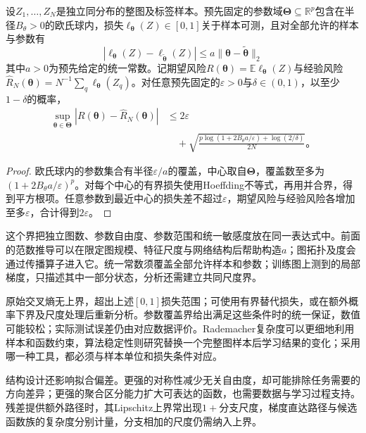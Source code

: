 \begin{theorem}[有界参数图预测的覆盖界]
\label{thm:gnn-cover-generalization}
设$Z_1,\ldots,Z_N$是独立同分布的整图及标签样本。预先固定的参数域$\bm{\Theta}\subseteq\mathbb{R}^{p}$包含在半径$B_\theta>0$的欧氏球内，损失$\ell_{\bm{\theta}}(Z)\in[0,1]$关于样本可测，且对全部允许的样本与参数有
\[
  |\ell_{\bm{\theta}}(Z)-\ell_{\widetilde{\bm{\theta}}}(Z)|
    \leq a\lVert\bm{\theta}-\widetilde{\bm{\theta}}\rVert_2
\]
其中$a>0$为预先给定的统一常数。记期望风险$R(\bm{\theta})=\mathbb{E}\ell_{\bm{\theta}}(Z)$与经验风险$\widehat R_N(\bm{\theta})=N^{-1}\sum_q\ell_{\bm{\theta}}(Z_q)$。对任意预先固定的$\varepsilon>0$与$\delta\in(0,1)$，以至少$1-\delta$的概率，
\begin{equation}
  \begin{aligned}
    \sup_{\bm{\theta}\in\bm{\Theta}}
      |R(\bm{\theta})-\widehat R_N(\bm{\theta})|
      &\leq2\varepsilon\\
      &\quad+\sqrt{\frac{p\log(1+2B_\theta a/\varepsilon)
        +\log(2/\delta)}{2N}}\text{。}
  \end{aligned}
  \label{eq:gnn-cover-risk}
\end{equation}
\end{theorem}
\begin{proof}
欧氏球内的参数集合有半径$\varepsilon/a$的覆盖，中心取自$\bm{\Theta}$，覆盖数至多为$(1+2B_\theta a/\varepsilon)^p$。对每个中心的有界损失使用Hoeffding不等式，再用并合界，得到平方根项。任意参数到最近中心的损失差不超过$\varepsilon$，期望风险与经验风险各增加至多$\varepsilon$，合计得到$2\varepsilon$。
\end{proof}

这个界把独立图数、参数自由度、参数范围和统一敏感度放在同一表达式中。前面的范数推导可以在限定图规模、特征尺度与网络结构后帮助构造$a$；图拓扑及度会通过传播算子进入它。统一常数须覆盖全部允许样本和参数；训练图上测到的局部梯度，只描述其中一部分状态，分析还需建立共同尺度界。

原始交叉熵无上界，超出上述$[0,1]$损失范围；可使用有界替代损失，或在额外概率下界及尺度处理后重新分析。参数覆盖界给出满足这些条件时的统一保证，数值可能较松；实际测试误差仍由对应数据评价。Rademacher复杂度可以更细地利用样本和函数约束，算法稳定性则研究替换一个完整图样本后学习结果的变化；采用哪一种工具，都必须与样本单位和损失条件对应。

结构设计还影响拟合偏差。更强的对称性减少无关自由度，却可能排除任务需要的方向差异；更强的聚合区分能力扩大可表达的函数，也需要数据与学习过程支持。残差提供额外路径时，其Lipschitz上界常出现$1+$分支尺度，梯度直达路径与候选函数族的复杂度分别计量，分支相加的尺度仍需纳入上界。


